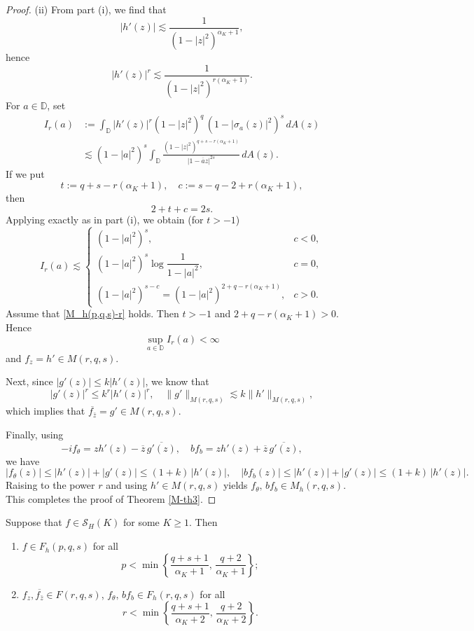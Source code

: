\documentclass[12pt, reqno]{amsart}
\begin{document}
\begin{proof}
\medskip
{(ii)} From part (i), we find that 
\[
|h'(z)|\lesssim \frac{1}{(1-|z|^{2})^{\alpha_K+1}},
\]
hence
\[
|h'(z)|^{r}\lesssim \frac{1}{(1-|z|^{2})^{r(\alpha_K+1)}}.
\]
For $a\in\mathbb D$, set
\begin{align*}
I_r(a)
&:=\int_{\mathbb{D}} |h'(z)|^{r}(1-|z|^{2})^{q}\,(1-|\sigma_a(z)|^{2})^{s}\,dA(z)\\
&\lesssim (1-|a|^{2})^{s}\int_{\mathbb{D}}
\frac{(1-|z|^{2})^{q+s-r(\alpha_K+1)}}{|1-\overline{a}z|^{2s}}\,dA(z).
\end{align*}
If we put
\[
t:=q+s-r(\alpha_K+1),\quad c:=s-q-2+r(\alpha_K+1),
\]
then $$2+t+c=2s.$$ Applying \cite[Lemma 3.10]{ZK} exactly as in part (i), we obtain (for $t>-1$)
\[
I_r(a)\lesssim
\begin{cases}
(1-|a|^2)^s, & c<0,\\[1mm]
(1-|a|^2)^s\log\!\dfrac{1}{1-|a|^2}, & c=0,\\[2mm]
(1-|a|^2)^{s-c}=(1-|a|^2)^{2+q-r(\alpha_K+1)}, & c>0.
\end{cases}
\]
Assume that \eqref{M_h(p,q,s)-r} holds. Then $t>-1$ and $2+q-r(\alpha_K+1)>0$. Hence $$\sup\limits_{a\in\mathbb D}I_r(a)<\infty$$ and $f_z=h'\in M(r,q,s)$.

Next, since $|g'(z)|\le k|h'(z)|$, we know that
\[
|g'(z)|^{r}\le k^{r}|h'(z)|^{r},
\quad
\|g'\|_{M(r,q,s)}\lesssim k\|h'\|_{M(r,q,s)},
\]
which implies that $\overline{f_{\bar z}}=g'\in M(r,q,s)$.

Finally, using
\[
-i f_{\theta}=zh'(z)-\overline{z}\,\overline{g'(z)},\quad
bf_{b}=zh'(z)+\overline{z}\,\overline{g'(z)},
\]
we have
\[
|f_{\theta}(z)|\le |h'(z)|+|g'(z)|\le (1+k)\,|h'(z)|,
\quad
|b f_{b}(z)|\le |h'(z)|+|g'(z)|\le (1+k)\,|h'(z)|.
\]
Raising to the power $r$ and using $h'\in M(r,q,s)$ yields $f_{\theta},\, b f_{b}\in M_{h}(r,q,s)$.
This completes the proof of Theorem \ref{M-th3}.
\end{proof}

\begin{theorem}\label{F-th3}
Suppose that $f\in \mathcal{S}_H(K)$ for some $K\geq1$. Then
\begin{enumerate}
\item[(i)] $f\in F_h(p,q,s)$ for all
\begin{equation}\label{F_h(p,q,s)-p}
p<\min\left\{\frac{q+s+1}{\alpha_K +1},\,\frac{q+2}{\alpha_K +1}\right\};
\end{equation}
\item[(ii)] $f_z,\overline{f_{\bar z}}\in F(r,q,s)$, $f_{\theta},\,b f_b\in F_h(r,q,s)$ for all
\begin{equation}\label{F_h(p,q,s)-r}
r<\min\left\{\frac{q+s+1}{\alpha_K+2},\,\frac{q+2}{\alpha_K+2}\right\}.
\end{equation}
\end{enumerate}
\end{theorem}
\end{document}
